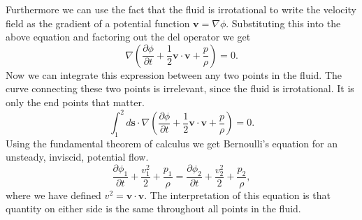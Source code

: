 \documentclass[12pt, letter]{report}
\begin{document}
Furthermore we can use the fact that the fluid is irrotational to write the velocity field as the gradient of a potential function $ \textbf{v} = \nabla \phi$. Substituting this into the above equation and factoring out the del operator we get
\begin{equation}
\nabla \left( \frac{\partial  \phi}{\partial t} +  \frac{1}{2}  \textbf{v} \cdot \textbf{v} + \frac{p}{\rho} \right) = 0.
\end{equation}
Now we can integrate this expression between any two points in the fluid. The curve connecting these two points is irrelevant, since the fluid is irrotational. It is only the end points that matter.
\begin{equation}
\int_1^2 d\textbf{s} \cdot \nabla \left( \frac{\partial  \phi}{\partial t} +  \frac{1}{2}  \textbf{v} \cdot \textbf{v} + \frac{p}{\rho} \right) = 0.
\end{equation}
Using the fundamental theorem of calculus we get Bernoulli's equation for an unsteady, inviscid, potential flow.
\begin{equation}
\frac{\partial  \phi_1}{\partial t} +  \frac{v_1^2}{2} + \frac{p_1}{\rho}=\frac{\partial  \phi_2}{\partial t} +  \frac{v_2^2}{2} + \frac{p_2}{\rho},
\end{equation}
where we have defined $v^2 = \textbf{v} \cdot \textbf{v}$. The interpretation of this equation is that quantity on either side is the same throughout all points in the fluid.
\end{document}
